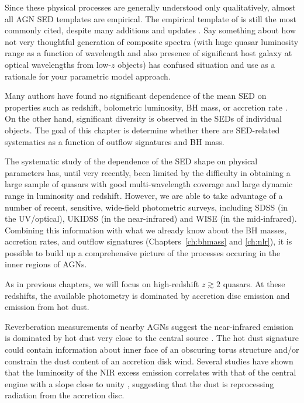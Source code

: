 Since these physical processes are generally understood only qualitatively, almost all \ac{AGN} \ac{SED} templates are empirical. 
The empirical template of \citet{elvis94} is still the most commonly cited, despite many additions and updates \citep[e.g.][]{polletta00, kuraszkiewicz03, risaliti04, richards06,  polletta07, lusso10, shang11, marchese12, trichas12}. 
Say something about how not very thoughtful generation of composite spectra (with huge quasar luminosity range as a function of wavelength and also presence of significant host galaxy at optical wavelengths from low-$z$ objects) has confused situation and use as a rationale for your parametric model approach.  

Many authors have found no significant dependence of the mean \ac{SED} on properties such as redshift, bolometric luminosity, \ac{BH} mass, or accretion rate \citep[e.g.][]{elvis12,hao13}. 
On the other hand, significant diversity is observed in the \ac{SED}s of individual objects. 
The goal of this chapter is determine whether there are \ac{SED}-related systematics as a function of outflow signatures and \ac{BH} mass. 

The systematic study of the dependence of the \ac{SED} shape on physical parameters has, until very recently, been limited by the difficulty in obtaining a large sample of quasars with good multi-wavelength coverage and large dynamic range in luminosity and redshift. 
However, we are able to take advantage of a number of recent, sensitive, wide-field photometric surveys, including SDSS (in the UV/optical), UKIDSS (in the near-infrared) and WISE (in the mid-infrared).
Combining this information with what we already know about the \ac{BH} masses, accretion rates, and outflow signatures (Chapters~\ref{ch:bhmass} and \ref{ch:nlr}), it is possible to build up a comprehensive picture of the processes occuring in the inner regions of AGNs. 

As in previous chapters, we will focus on high-redshift $z\gtrsim2$ quasars. 
At these redshifts, the available photometry is dominated by accretion disc emission and emission from hot dust. 

Reverberation measurements of nearby AGNs suggest the near-infrared emission is dominated by hot dust very close to the central source \citep[few tens of light days; e.g.][]{minezaki04,suganuma06}. 
The hot dust signature could contain information about inner face of an obscuring torus structure and/or constrain the dust content of an accretion disk wind. 
Several studies have shown that the luminosity of the NIR excess emission correlates with that of the central engine with a slope close to unity \cite[e.g.][]{gallagher07}, suggesting that the dust is reprocessing radiation from the accretion disc. 

